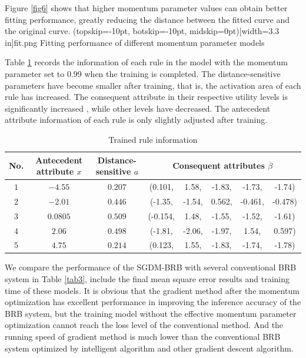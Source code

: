 \documentclass{ieeeaccess}
\begin{document}
Figure \ref{fig6} shows that higher momentum parameter values can obtain better fitting performance,
greatly reducing the distance between the fitted curve and the original curve.
\Figure[!t](topskip=-10pt, botskip=-10pt, midskip=0pt)[width=3.3 in]{fit.png}
{Fitting performance of different momentum parameter models\label{fig6}}

Table \ref{tab2} records the information of each rule in the model with the momentum parameter set to $0.99$ when the training is completed.
The distance-sensitive parameters have become smaller after training, that is, the activation area of each rule has increased.
The consequent attribute in their respective utility levels is significantly increased , while other levels have decreased.
The antecedent attribute information of each rule is only slightly adjusted after training.

\begin{table}
    \caption{Trained rule information}
    \centering
    \normalsize
    \label{tab2}
    \begin{tabular}{cccccccc}
        \hline
        No. & Antecedent attribute $x$ & Distance-sensitive $a$ & \multicolumn{5}{c}{Consequent attributes $\overline{\beta}$}                                       \\
        \hline
        $1$ & $-4.55$                  & $0.207$                & (0.101,                                                      & 1.58,  & -1.83, & -1.73,  & -1.74)  \\
        $2$ & $-2.01$                  & $0.446$                & (-1.35,                                                      & -1.54, & 0.562, & -0.461, & -0.478) \\
        $3$ & $0.0805$                 & $0.509$                & (-0.154,                                                     & 1.48,  & -1.55, & -1.52,  & -1.61)  \\
        $4$ & $2.06$                   & $0.498$                & (-1.81,                                                      & -2.06, & -1.97, & 1.54,   & 0.597)  \\
        $5$ & $4.75$                   & $0.214$                & (0.123,                                                      & 1.55,  & -1.83, & -1.74,  & -1.78)  \\
        \hline
    \end{tabular}
\end{table}

We compare the performance of the SGDM-BRB with several conventional BRB system in Table \ref{tab3},
include the final mean square error results and training time of these models.
It is obvious that the gradient method after the momentum optimization has excellent performance in improving the inference accuracy of the BRB system,
but the training model without the effective momentum parameter optimization cannot reach the loss level of the conventional method.
And the running speed of gradient method is much lower than the conventional BRB system optimized by intelligent algorithm and other gradient descent algorithm.
\end{document}
